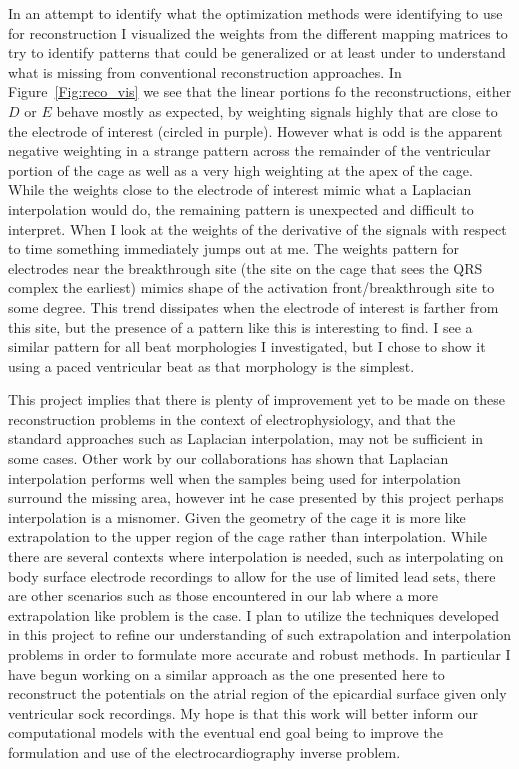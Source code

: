 \documentclass[12pt]{article}
\begin{document}
In an attempt to identify what the optimization methods were identifying to use for reconstruction I visualized the weights from the different mapping matrices to try to identify patterns that could be generalized or at least under to understand what is missing from conventional reconstruction approaches. In Figure~\ref{Fig:reco_vis} we see that the linear portions fo the reconstructions, either $D$ or $E$ behave mostly as expected, by weighting signals highly that are close to the electrode of interest (circled in purple). However what is odd is the apparent negative weighting in a strange pattern across the remainder of the ventricular portion of the cage as well as a very high weighting at the apex of the cage. While the weights close to the electrode of interest mimic what a Laplacian interpolation would do, the remaining pattern is unexpected and difficult to interpret. When I look at the weights of the derivative of the signals with respect to time something immediately jumps out at me. The weights pattern for electrodes near the breakthrough site (the site on the cage that sees the QRS complex the earliest) mimics shape of the activation front/breakthrough site to some degree. This trend dissipates when the electrode of interest is farther from this site, but the presence of a pattern like this is interesting to find. I see a similar pattern for all beat morphologies I investigated, but I chose to show it using a paced ventricular beat as that morphology is the simplest.

This project implies that there is plenty of improvement yet to be made on these reconstruction problems in the context of electrophysiology, and that the standard approaches such as Laplacian interpolation, may not be sufficient in some cases. Other work by our collaborations has shown that Laplacian interpolation performs well when the samples being used for interpolation surround the missing area, however int he case presented by this project perhaps interpolation is a misnomer. Given the geometry of the cage it is more like extrapolation to the upper region of the cage rather than interpolation. While there are several contexts where interpolation is needed, such as interpolating on body surface electrode recordings to allow for the use of limited lead sets, there are other scenarios such as those encountered in our lab where a more extrapolation like problem is the case. I plan to utilize the techniques developed in this project to refine our understanding of such extrapolation and interpolation problems in order to formulate more accurate and robust methods. In particular I have begun working on a similar approach as the one presented here to reconstruct the potentials on the atrial region of the epicardial surface given only ventricular sock recordings. My hope is that this work will better inform our computational models with the eventual end goal being to improve the formulation and use of the electrocardiography inverse problem.
\end{document}
